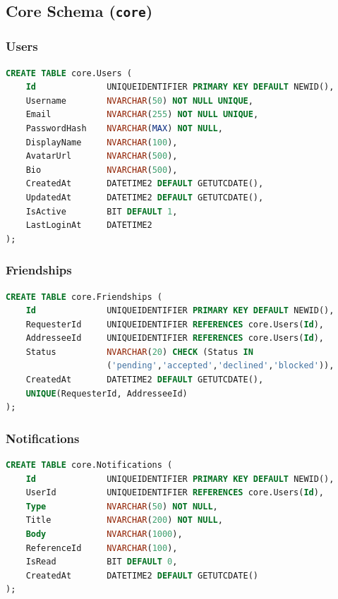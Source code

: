 \documentclass[12pt,letterpaper]{article}
\begin{document}
\subsection{Core Schema (\texttt{core})}

\subsubsection{Users}
\begin{lstlisting}[style=code,language=SQL]
CREATE TABLE core.Users (
    Id              UNIQUEIDENTIFIER PRIMARY KEY DEFAULT NEWID(),
    Username        NVARCHAR(50) NOT NULL UNIQUE,
    Email           NVARCHAR(255) NOT NULL UNIQUE,
    PasswordHash    NVARCHAR(MAX) NOT NULL,
    DisplayName     NVARCHAR(100),
    AvatarUrl       NVARCHAR(500),
    Bio             NVARCHAR(500),
    CreatedAt       DATETIME2 DEFAULT GETUTCDATE(),
    UpdatedAt       DATETIME2 DEFAULT GETUTCDATE(),
    IsActive        BIT DEFAULT 1,
    LastLoginAt     DATETIME2
);
\end{lstlisting}

\subsubsection{Friendships}
\begin{lstlisting}[style=code,language=SQL]
CREATE TABLE core.Friendships (
    Id              UNIQUEIDENTIFIER PRIMARY KEY DEFAULT NEWID(),
    RequesterId     UNIQUEIDENTIFIER REFERENCES core.Users(Id),
    AddresseeId     UNIQUEIDENTIFIER REFERENCES core.Users(Id),
    Status          NVARCHAR(20) CHECK (Status IN
                    ('pending','accepted','declined','blocked')),
    CreatedAt       DATETIME2 DEFAULT GETUTCDATE(),
    UNIQUE(RequesterId, AddresseeId)
);
\end{lstlisting}

\subsubsection{Notifications}
\begin{lstlisting}[style=code,language=SQL]
CREATE TABLE core.Notifications (
    Id              UNIQUEIDENTIFIER PRIMARY KEY DEFAULT NEWID(),
    UserId          UNIQUEIDENTIFIER REFERENCES core.Users(Id),
    Type            NVARCHAR(50) NOT NULL,
    Title           NVARCHAR(200) NOT NULL,
    Body            NVARCHAR(1000),
    ReferenceId     NVARCHAR(100),
    IsRead          BIT DEFAULT 0,
    CreatedAt       DATETIME2 DEFAULT GETUTCDATE()
);
\end{lstlisting}
\end{document}
